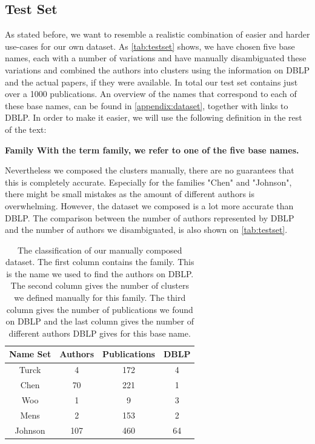 \subsection{Test Set}
\label{sec:testset}

As stated before, we want to resemble a realistic combination of easier and harder use-cases for our own dataset. As \autoref{tab:testset} shows, we have chosen five base names, each with a number of variations and have manually disambiguated these variations and combined the authors into clusters using the information on DBLP and the actual papers, if they were available. In total our test set contains just over a 1000 publications. An overview of the names that correspond to each of these base names, can be found in \autoref{appendix:dataset}, together with links to DBLP. In order to make it easier, we will use the following definition in the rest of the text:

\begin{mydef}
	\bfseries{Family} With the term family, we refer to one of the five base names.
\end{mydef}

Nevertheless we composed the clusters manually, there are no guarantees that this is completely accurate. Especially for the families "Chen" and "Johnson", there might be small mistakes as the amount of different authors is overwhelming. However, the dataset we composed is a lot more accurate than DBLP. The comparison between the number of authors represented by DBLP and the number of authors we disambiguated, is also shown on \autoref{tab:testset}.

\begin{table}
	\centering
		\begin{tabular}[ht]{|c|c|c|c|}
			\hline
			\bfseries{Name Set} & \bfseries{Authors} & \bfseries{Publications} & \bfseries{DBLP} \\
			\hline
			Turck & 4 & 172 & 4 \\
			\hline
			Chen & 70 & 221 & 1 \\
			\hline
			Woo & 1 & 9 & 3 \\
			\hline
			Mens & 2 & 153 & 2 \\
			\hline
			Johnson & 107 & 460 & 64 \\
			\hline
		\end{tabular}
	\caption{The classification of our manually composed dataset. The first column contains the family. This is the name we used to find the authors on DBLP. The second column gives the number of clusters we defined manually for this family. The third column gives the number of publications we found on DBLP and the last column gives the number of different authors DBLP gives for this base name.}
	\label{tab:testset}
\end{table}

